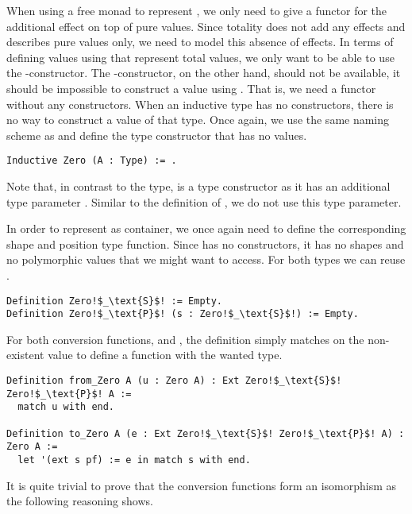 When using a free monad to represent , we only need to give a functor for the additional effect on top of pure values.
Since totality does not add any effects and describes pure values only, we need to model this absence of effects.
In terms of defining values using  that represent total values, we only want to be able to use the \--constructor.
The \--constructor, on the other hand, should not be available, it should be impossible to construct a value using .
That is, we need a functor without any constructors.
When an inductive type has no constructors, there is no way to construct a value of that type.
Once again, we use the same naming scheme as \citeauthor{swierstra2008data} and define the type constructor  that has no values.

\begin{verbatim}
Inductive Zero (A : Type) := .
\end{verbatim}

Note that, in contrast to the  type,  is a type constructor as it has an additional type parameter .
Similar to the definition of , we do not use this type parameter.

In order to represent  as container, we once again need to define the corresponding shape and position type function.
Since  has no constructors, it has no shapes and no polymorphic values that we might want to access.
For both types we can reuse .

\begin{verbatim}
Definition Zero!$_\text{S}$! := Empty.
Definition Zero!$_\text{P}$! (s : Zero!$_\text{S}$!) := Empty.
\end{verbatim}

For both conversion functions,  and , the definition simply matches on the non\--existent value to define a function with the wanted type.

\begin{verbatim}
Definition from_Zero A (u : Zero A) : Ext Zero!$_\text{S}$! Zero!$_\text{P}$! A :=
  match u with end.

Definition to_Zero A (e : Ext Zero!$_\text{S}$! Zero!$_\text{P}$! A) : Zero A :=
  let '(ext s pf) := e in match s with end.
\end{verbatim}

It is quite trivial to prove that the conversion functions form an isomorphism as the following reasoning shows.

